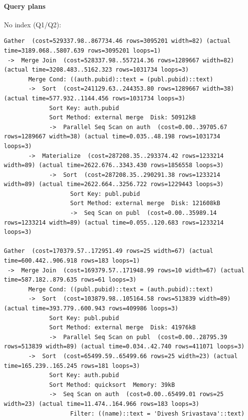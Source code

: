 \documentclass[11pt]{scrartcl}
\begin{document}
\paragraph{Query plans}\mbox{}

No index (Q1/Q2):

{\small
\parskip0pt\begin{verbatim}
Gather  (cost=529337.98..867734.46 rows=3095201 width=82) (actual time=3189.068..5807.639 rows=3095201 loops=1)
 ->  Merge Join  (cost=528337.98..557214.36 rows=1289667 width=82) (actual time=3208.483..5162.323 rows=1031734 loops=3)
       Merge Cond: ((auth.pubid)::text = (publ.pubid)::text)
       ->  Sort  (cost=241129.63..244353.80 rows=1289667 width=38) (actual time=577.932..1144.456 rows=1031734 loops=3)
             Sort Key: auth.pubid
             Sort Method: external merge  Disk: 50912kB
             ->  Parallel Seq Scan on auth  (cost=0.00..39705.67 rows=1289667 width=38) (actual time=0.035..48.198 rows=1031734 loops=3)
       ->  Materialize  (cost=287208.35..293374.42 rows=1233214 width=89) (actual time=2622.676..3343.430 rows=1856558 loops=3)
             ->  Sort  (cost=287208.35..290291.38 rows=1233214 width=89) (actual time=2622.664..3256.722 rows=1229443 loops=3)
                   Sort Key: publ.pubid
                   Sort Method: external merge  Disk: 121608kB
                   ->  Seq Scan on publ  (cost=0.00..35989.14 rows=1233214 width=89) (actual time=0.055..120.683 rows=1233214 loops=3)

Gather  (cost=170379.57..172951.49 rows=25 width=67) (actual time=600.442..906.918 rows=183 loops=1)
 ->  Merge Join  (cost=169379.57..171948.99 rows=10 width=67) (actual time=587.182..879.635 rows=61 loops=3)
       Merge Cond: ((publ.pubid)::text = (auth.pubid)::text)
       ->  Sort  (cost=103879.98..105164.58 rows=513839 width=89) (actual time=393.779..600.943 rows=409986 loops=3)
             Sort Key: publ.pubid
             Sort Method: external merge  Disk: 41976kB
             ->  Parallel Seq Scan on publ  (cost=0.00..28795.39 rows=513839 width=89) (actual time=0.034..42.740 rows=411071 loops=3)
       ->  Sort  (cost=65499.59..65499.66 rows=25 width=23) (actual time=165.239..165.245 rows=181 loops=3)
             Sort Key: auth.pubid
             Sort Method: quicksort  Memory: 39kB
             ->  Seq Scan on auth  (cost=0.00..65499.01 rows=25 width=23) (actual time=11.474..164.966 rows=183 loops=3)
                   Filter: ((name)::text = 'Divesh Srivastava'::text)
\end{verbatim}}
\end{document}
